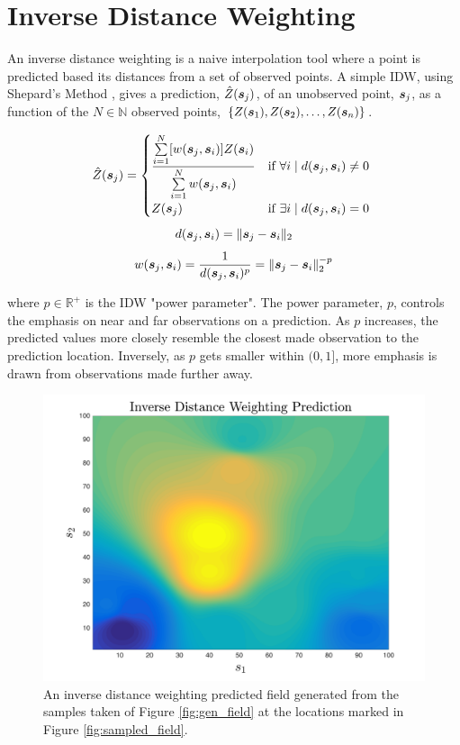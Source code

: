 \section{Inverse Distance Weighting} \label{sec:idw_intro}
An inverse distance weighting is a naive interpolation tool where a point is predicted based its distances from a set of observed points. A simple IDW, using Shepard's Method \cite{shepard:idw}, gives a prediction, $\hat{Z}({\it{\boldsymbol{s}}}_j)$, of an unobserved point, ${\it{\boldsymbol{s}}}_j$, as a function of the $N \in \mathbb{N}$ observed points, $\{Z({\it{\boldsymbol{s}}}_1), Z({\it{\boldsymbol{s}}}_2), \hdots, Z({\it{\boldsymbol{s}}}_n) \}$.

\begin{equation}
	\hat{Z}({\it{\boldsymbol{s}}}_j)=\begin{cases}
			\dfrac{\sum\limits_{i=1}^N [w({\it{\boldsymbol{s}}}_j, {\it{\boldsymbol{s}}}_i)] Z({\it{\boldsymbol{s}}}_i) }{\sum\limits_{i=1}^{N} w({\it{\boldsymbol{s}}}_j, {\it{\boldsymbol{s}}}_i)} & \text{if}\ \forall i \mid d({\it{\boldsymbol{s}}}_j,{\it{\boldsymbol{s}}}_i) \neq 0\ \\
			Z({\it{\boldsymbol{s}}}_j) & \text{if}\ \exists i \mid d({\it{\boldsymbol{s}}}_j,{\it{\boldsymbol{s}}}_i)=0\\
		\end{cases}
\end{equation}
\begin{equation}
    d({\it{\boldsymbol{s}}}_j,{\it{\boldsymbol{s}}}_{i})=\|{\it{\boldsymbol{s}}}_j-{\it{\boldsymbol{s}}}_i\|_{2}
\end{equation}
\begin{equation}
	w({\it{\boldsymbol{s}}}_j, {\it{\boldsymbol{s}}}_i)=\frac{1}{d({\it{\boldsymbol{s}}}_j,{\it{\boldsymbol{s}}}_{i})^{p}}=\|{\it{\boldsymbol{s}}}_j-{\it{\boldsymbol{s}}}_i\|_{2}^{-p}
\end{equation}

\noindent where $p \in \mathbb{R}^{+}$ is the IDW "power parameter". The power parameter, $p$, controls the emphasis on near and far observations on a prediction. As $p$ increases, the predicted values more closely resemble the closest made observation to the prediction location. Inversely, as $p$ gets smaller within $(0, 1]$, more emphasis is drawn from observations made further away.\\

\begin{figure}[ht!]
    \centering
    \includegraphics[width=0.8\linewidth]{figures/idw_predicted_field.png}
    \ssp
    \caption{An inverse distance weighting predicted field generated from the samples taken of Figure \ref{fig:gen_field} at the locations marked in Figure \ref{fig:sampled_field}.}
    \label{fig:idw_field}
\end{figure}

